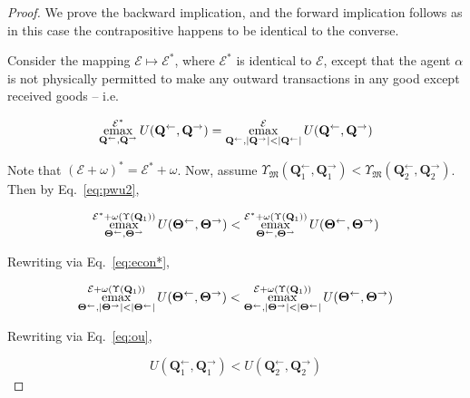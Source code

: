 \documentclass{journal}
\theoremstyle{plain}
\theoremstyle{definition}
\theoremstyle{remark}
\newcommand{\economy}{\ensuremath{\mathcal{E}}}
\newcommand{\emax}{\ensuremath{\operatornamewithlimits{emax}}}
\newcommand{\quantl}{\ensuremath{\mathbf{Q}}} %
\newcommand{\quantg}{\ensuremath{\mathbf{\Theta}}} %
\newcommand{\agenta}{\ensuremath{\alpha}}
\newcommand{\agentz}{\ensuremath{\omega}}
\newcommand{\money}{\ensuremath{\mathfrak{M}}}
\newcommand{\utility}{\ensuremath{U}}
\newcommand{\outility}{\ensuremath{\Upsilon}}
\begin{document}
\begin{proof}
    We prove the backward implication, and the forward implication follows as in this case the contrapositive happens to be identical to the converse.
    
    Consider the mapping $\economy\mapsto\economy^*$, where $\economy^*$ is identical to $\economy$, except that the agent $\agenta$ is not physically permitted to make any outward transactions in any good except received goods -- i.e.
    
    \begin{equation}
        \label{eq:econ*}
        \emax\limits_{\quantl^\leftarrow, \quantl^\rightarrow}^{\economy^*} \utility(\quantl^\leftarrow, \quantl^\rightarrow) = 
        \emax\limits_{\quantl^\leftarrow, |\quantl^\rightarrow|<|\quantl^\leftarrow|}^{\economy} \utility(\quantl^\leftarrow, \quantl^\rightarrow)
    \end{equation}
    
    Note that $(\economy + \agentz)^* = \economy^* + \agentz$. Now, assume $\outility_\money(\quantl_1^\leftarrow, \quantl_1^\rightarrow)<\outility_\money(\quantl_2^\leftarrow, \quantl_2^\rightarrow)$. Then by Eq.~\ref{eq:pwu2}, 
    
    \begin{equation*}
        \emax\limits_{\quantg^\leftarrow, \quantg^\rightarrow}^{\economy^* + \agentz(\outility(\quantl_1))} \utility(\quantg^\leftarrow, \quantg^\rightarrow) < \emax\limits_{\quantg^\leftarrow, \quantg^\rightarrow}^{\economy^*+\agentz(\outility(\quantl_1))} \utility(\quantg^\leftarrow, \quantg^\rightarrow)
    \end{equation*}
    
    Rewriting via Eq.~\ref{eq:econ*}, 
    
    \begin{equation*}
        \emax\limits_{\quantg^\leftarrow, |\quantg^\rightarrow|<|\quantg^\leftarrow|}^{\economy + \agentz(\outility(\quantl_1))} \utility(\quantg^\leftarrow, \quantg^\rightarrow) < \emax\limits_{\quantg^\leftarrow, |\quantg^\rightarrow|<|\quantg^\leftarrow|}^{\economy+\agentz(\outility(\quantl_1))} \utility(\quantg^\leftarrow, \quantg^\rightarrow)
    \end{equation*}
    
    Rewriting via Eq.~\ref{eq:ou},
    
    \begin{equation*}
        \utility(\quantl_1^\leftarrow, \quantl_1^\rightarrow) < \utility(\quantl_2^\leftarrow, \quantl_2^\rightarrow) 
    \end{equation*}
\end{proof}
\end{document}
